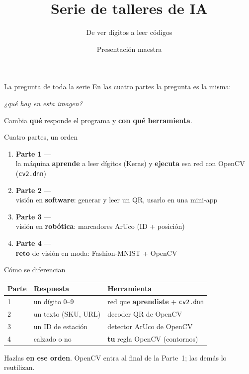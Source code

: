 \documentclass[aspectratio=169]{beamer}
\title{Serie de talleres de IA}
\subtitle{De ver dígitos a leer códigos}
\author{Presentación maestra}
\begin{document}
\begin{frame}
  \titlepage
\end{frame}

\begin{frame}{La pregunta de toda la serie}
  En las cuatro partes la pregunta es la misma:

  \begin{center}
    \Large \emph{¿qué hay en esta imagen?}
  \end{center}

  Cambia \textbf{qué} responde el programa y \textbf{con qué herramienta}.
\end{frame}

\begin{frame}{Cuatro partes, un orden}
  \begin{enumerate}
    \item \textbf{Parte 1} --- \\
          la máquina \textbf{aprende} a leer dígitos (Keras) y \textbf{ejecuta} esa red con OpenCV (\texttt{cv2.dnn})
    \item \textbf{Parte 2} --- \\
          visión en \textbf{software}: generar y leer un QR, usarlo en una mini-app
    \item \textbf{Parte 3} --- \\
          visión en \textbf{robótica}: marcadores ArUco (ID + posición)
    \item \textbf{Parte 4} --- \\
          \textbf{reto} de visión en moda: Fashion-MNIST + OpenCV
  \end{enumerate}
\end{frame}

\begin{frame}{Cómo se diferencian}
  \small
  \begin{tabular}{@{}llp{4.6cm}@{}}
    \toprule
    Parte & Respuesta & Herramienta \\
    \midrule
    1 & un dígito 0--9 & red que \textbf{aprendiste} + \texttt{cv2.dnn} \\
    2 & un texto (SKU, URL) & decoder QR de OpenCV \\
    3 & un ID de estación & detector ArUco de OpenCV \\
    4 & calzado o no & \textbf{tu} regla OpenCV (contornos) \\
    \bottomrule
  \end{tabular}

  \vspace{1em}
  Hazlas \textbf{en ese orden}. OpenCV entra al final de la Parte~1; las demás lo reutilizan.
\end{frame}
\end{document}
